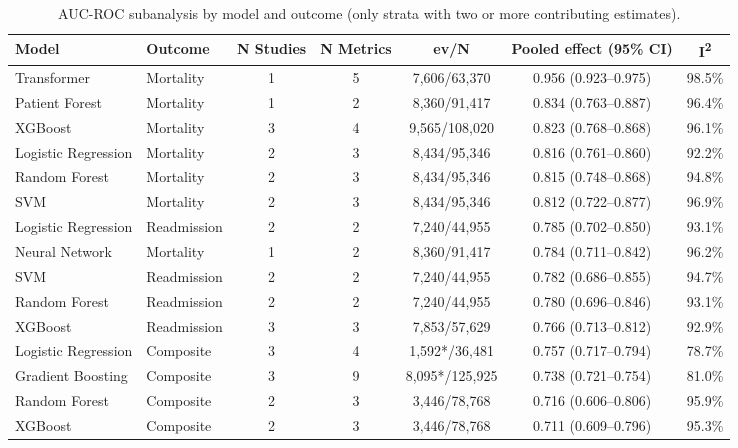 \begin{table}[H]
\centering
\caption{AUC-ROC subanalysis by model and outcome (only strata with two or more contributing estimates).}\label{tab:subgroup_ml}
\small
\begin{adjustbox}{max width=\textwidth}
\begin{tabular}{llccccc}
\toprule
\textbf{Model} & \textbf{Outcome} & \textbf{N Studies} & \textbf{N Metrics} & \textbf{ev/N} & \textbf{Pooled effect (95\% CI)} & \textbf{I\textsuperscript{2}} \\
\midrule
    Transformer & Mortality & 1 & 5 & 7,606/63,370 & 0.956 (0.923--0.975) & 98.5\% \\
    Patient Forest & Mortality & 1 & 2 & 8,360/91,417 & 0.834 (0.763--0.887) & 96.4\% \\
    XGBoost & Mortality & 3 & 4 & 9,565/108,020 & 0.823 (0.768--0.868) & 96.1\% \\
    Logistic Regression & Mortality & 2 & 3 & 8,434/95,346 & 0.816 (0.761--0.860) & 92.2\% \\
    Random Forest & Mortality & 2 & 3 & 8,434/95,346 & 0.815 (0.748--0.868) & 94.8\% \\
    SVM & Mortality & 2 & 3 & 8,434/95,346 & 0.812 (0.722--0.877) & 96.9\% \\
    Logistic Regression & Readmission & 2 & 2 & 7,240/44,955 & 0.785 (0.702--0.850) & 93.1\% \\
    Neural Network & Mortality & 1 & 2 & 8,360/91,417 & 0.784 (0.711--0.842) & 96.2\% \\
    SVM & Readmission & 2 & 2 & 7,240/44,955 & 0.782 (0.686--0.855) & 94.7\% \\
    Random Forest & Readmission & 2 & 2 & 7,240/44,955 & 0.780 (0.696--0.846) & 93.1\% \\
    XGBoost & Readmission & 3 & 3 & 7,853/57,629 & 0.766 (0.713--0.812) & 92.9\% \\
    Logistic Regression & Composite & 3 & 4 & 1,592*/36,481 & 0.757 (0.717--0.794) & 78.7\% \\
    Gradient Boosting & Composite & 3 & 9 & 8,095*/125,925 & 0.738 (0.721--0.754) & 81.0\% \\
    Random Forest & Composite & 2 & 3 & 3,446/78,768 & 0.716 (0.606--0.806) & 95.9\% \\
    XGBoost & Composite & 2 & 3 & 3,446/78,768 & 0.711 (0.609--0.796) & 95.3\% \\
\bottomrule
\end{tabular}
\end{adjustbox}

\end{table}

